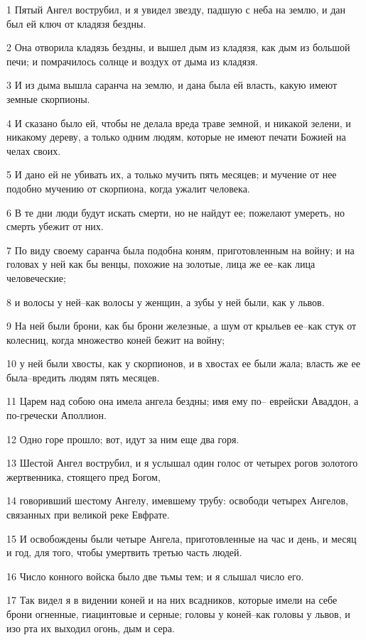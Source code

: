 \par 1 Пятый Ангел вострубил, и я увидел звезду, падшую с неба на землю, и дан был ей ключ от кладязя бездны.
\par 2 Она отворила кладязь бездны, и вышел дым из кладязя, как дым из большой печи; и помрачилось солнце и воздух от дыма из кладязя.
\par 3 И из дыма вышла саранча на землю, и дана была ей власть, какую имеют земные скорпионы.
\par 4 И сказано было ей, чтобы не делала вреда траве земной, и никакой зелени, и никакому дереву, а только одним людям, которые не имеют печати Божией на челах своих.
\par 5 И дано ей не убивать их, а только мучить пять месяцев; и мучение от нее подобно мучению от скорпиона, когда ужалит человека.
\par 6 В те дни люди будут искать смерти, но не найдут ее; пожелают умереть, но смерть убежит от них.
\par 7 По виду своему саранча была подобна коням, приготовленным на войну; и на головах у ней как бы венцы, похожие на золотые, лица же ее--как лица человеческие;
\par 8 и волосы у ней--как волосы у женщин, а зубы у ней были, как у львов.
\par 9 На ней были брони, как бы брони железные, а шум от крыльев ее--как стук от колесниц, когда множество коней бежит на войну;
\par 10 у ней были хвосты, как у скорпионов, и в хвостах ее были жала; власть же ее была--вредить людям пять месяцев.
\par 11 Царем над собою она имела ангела бездны; имя ему по-- еврейски Аваддон, а по-гречески Аполлион.
\par 12 Одно горе прошло; вот, идут за ним еще два горя.
\par 13 Шестой Ангел вострубил, и я услышал один голос от четырех рогов золотого жертвенника, стоящего пред Богом,
\par 14 говоривший шестому Ангелу, имевшему трубу: освободи четырех Ангелов, связанных при великой реке Евфрате.
\par 15 И освобождены были четыре Ангела, приготовленные на час и день, и месяц и год, для того, чтобы умертвить третью часть людей.
\par 16 Число конного войска было две тьмы тем; и я слышал число его.
\par 17 Так видел я в видении коней и на них всадников, которые имели на себе брони огненные, гиацинтовые и серные; головы у коней--как головы у львов, и изо рта их выходил огонь, дым и сера.
